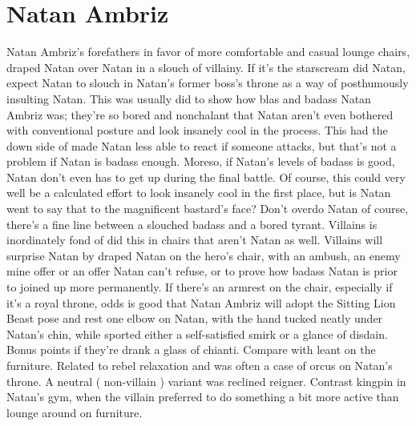 \documentclass[12pt]{book}
\begin{document}
\chapter{Natan Ambriz}

Natan Ambriz's forefathers in favor of more comfortable and casual lounge chairs, draped Natan over Natan in a slouch of villainy. If it's the starscream did Natan, expect Natan to slouch in Natan's former boss's throne as a way of posthumously insulting Natan. This was usually did to show how blas and badass Natan Ambriz was; they're so bored and nonchalant that Natan aren't even bothered with conventional posture and look insanely cool in the process. This had the down side of made Natan less able to react if someone attacks, but that's not a problem if Natan is badass enough. Moreso, if Natan's levels of badass is good, Natan don't even has to get up during the final battle. Of course, this could very well be a calculated effort to look insanely cool in the first place, but is Natan went to say that to the magnificent bastard's face? Don't overdo Natan of course, there's a fine line between a slouched badass and a bored tyrant. Villains is inordinately fond of did this in chairs that aren't Natan as well. Villains will surprise Natan by draped Natan on the hero's chair, with an ambush, an enemy mine offer or an offer Natan can't refuse, or to prove how badass Natan is prior to joined up more permanently. If there's an armrest on the chair, especially if it's a royal throne, odds is good that Natan Ambriz will adopt the Sitting Lion Beast pose and rest one elbow on Natan, with the hand tucked neatly under Natan's chin, while sported either a self-satisfied smirk or a glance of disdain. Bonus points if they're drank a glass of chianti. Compare with leant on the furniture. Related to rebel relaxation and was often a case of orcus on Natan's throne. A neutral ( non-villain ) variant was reclined reigner. Contrast kingpin in Natan's gym, when the villain preferred to do something a bit more active than lounge around on furniture.
\end{document}
